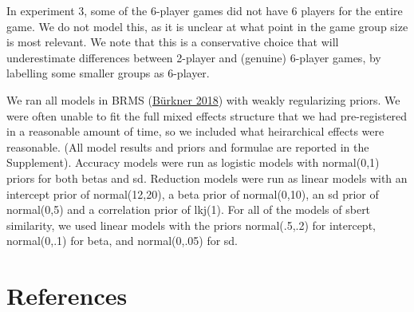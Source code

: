 \documentclass[
  english,
  a4paper,
]{article}
\begin{document}
In experiment 3, some of the 6-player games did not have 6 players for the entire game. We do not model this, as it is unclear at what point in the game group size is most relevant. We note that this is a conservative choice that will underestimate differences between 2-player and (genuine) 6-player games, by labelling some smaller groups as 6-player.

We ran all models in BRMS (\protect\hyperlink{ref-burkner2018}{Bürkner 2018}) with weakly regularizing priors. We were often unable to fit the full mixed effects structure that we had pre-registered in a reasonable amount of time, so we included what heirarchical effects were reasonable. (All model results and priors and formulae are reported in the Supplement). Accuracy models were run as logistic models with normal(0,1) priors for both betas and sd. Reduction models were run as linear models with an intercept prior of normal(12,20), a beta prior of normal(0,10), an sd prior of normal(0,5) and a correlation prior of lkj(1). For all of the models of sbert similarity, we used linear models with the priors normal(.5,.2) for intercept, normal(0,.1) for beta, and normal(0,.05) for sd.

\hypertarget{references}{%
\section{References}\label{references}}

\setlength{\parindent}{-0.1in} 
\setlength{\leftskip}{0.125in}

\noindent
\end{document}
